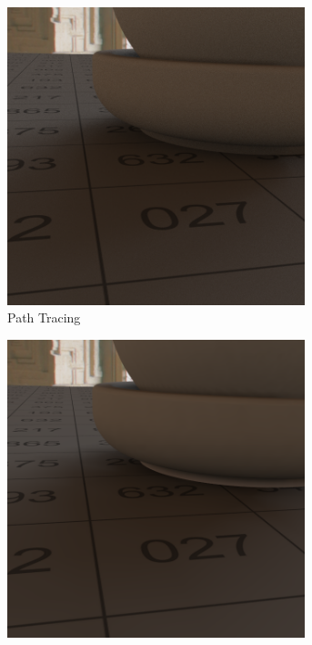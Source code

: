 		\begin{figure}[h]
			\begin{subfigure}[t]{0.33\textwidth}
				\center
				\includegraphics[width=0.95\textwidth]{pic/irrmap-shaderball_e4-ref.png}
				\caption{Path Tracing}
				\label{subfig:irrmap-shaderball-e4-ref}
			\end{subfigure}
			\begin{subfigure}[t]{0.33\textwidth}
				\center
				\includegraphics[width=0.95\textwidth]{pic/irrmap-shaderball_e4-vmap.png}

\end{subfigure}
\end{figure}
